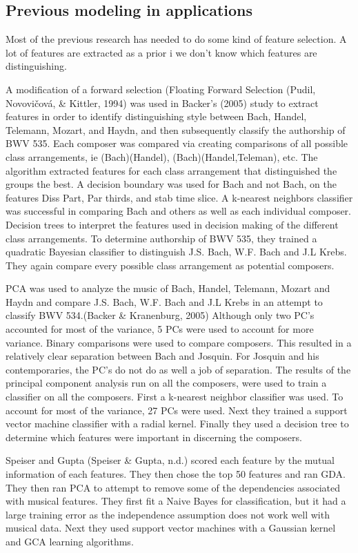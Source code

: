 \documentclass[12pt,twoside]{reedthesis}
\theoremstyle{definition}
\theoremstyle{definition}
\theoremstyle{definition}
\theoremstyle{remark}
\begin{document}
\subsection{Previous modeling in
applications}\label{previous-modeling-in-applications}

Most of the previous research has needed to do some kind of feature
selection. A lot of features are extracted as a prior i we don't know
which features are distinguishing.

A modification of a forward selection (Floating Forward Selection
(Pudil, Novovičová, \& Kittler, 1994) was used in Backer's (2005) study
to extract features in order to identify distinguishing style between
Bach, Handel, Telemann, Mozart, and Haydn, and then subsequently
classify the authorship of BWV 535. Each composer was compared via
creating comparisons of all possible class arrangements, ie
(Bach)(Handel), (Bach)(Handel,Teleman), etc. The algorithm extracted
features for each class arrangement that distinguished the groups the
best. A decision boundary was used for Bach and not Bach, on the
features Diss Part, Par thirds, and stab time slice. A k-nearest
neighbors classifier was successful in comparing Bach and others as well
as each individual composer. Decision trees to interpret the features
used in decision making of the different class arrangements. To
determine authorship of BWV 535, they trained a quadratic Bayesian
classifier to distinguish J.S. Bach, W.F. Bach and J.L Krebs. They again
compare every possible class arrangement as potential composers.

PCA was used to analyze the music of Bach, Handel, Telemann, Mozart and
Haydn and compare J.S. Bach, W.F. Bach and J.L Krebs in an attempt to
classify BWV 534.(Backer \& Kranenburg, 2005) Although only two PC's
accounted for most of the variance, 5 PCs were used to account for more
variance. Binary comparisons were used to compare composers. This
resulted in a relatively clear separation between Bach and Josquin. For
Josquin and his contemporaries, the PC's do not do as well a job of
separation. The results of the principal component analysis run on all
the composers, were used to train a classifier on all the composers.
First a k-nearest neighbor classifier was used. To account for most of
the variance, 27 PCs were used. Next they trained a support vector
machine classifier with a radial kernel. Finally they used a decision
tree to determine which features were important in discerning the
composers.

Speiser and Gupta (Speiser \& Gupta, n.d.) scored each feature by the
mutual information of each features. They then chose the top 50 features
and ran GDA. They then ran PCA to attempt to remove some of the
dependencies associated with musical features. They first fit a Naive
Bayes for classification, but it had a large training error as the
independence assumption does not work well with musical data. Next they
used support vector machines with a Gaussian kernel and GCA learning
algorithms.
\end{document}
